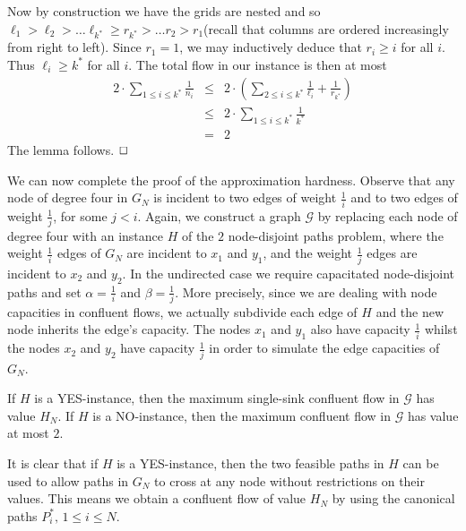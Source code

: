 \documentclass[12pt]{article}
\newcommand{\qed}{$\hfill{\Box}$}
\begin{document}
Now by construction we have the grids are nested and so
$\ell_1 > \ell_2 > \ldots \ell_{k^*} \geq r_{k^*} > \ldots r_2 > r_1$(recall that columns are ordered increasingly from
right to left). Since $r_1=1$, we may inductively deduce that
$r_{i} \geq i$ for all $i$. Thus $\ell_i \ge k^*$ for all $i$.
The total flow in our instance is then at most
\begin{eqnarray*}
2\cdot \sum_{1 \leq i \leq k^*}  \frac{1}{n_i} &\leq& 2\cdot (\sum_{2 \leq i \leq k^*} \frac{1}{\ell_i} + \frac{1}{r_{k^*}}) \\
&\le& 2\cdot \sum_{1 \leq i \leq k^*} \frac{1}{k^*} \\
&=& 2
\end{eqnarray*}
The lemma follows.
\qed








We can now complete the proof of the approximation hardness. Observe that any
node of degree four in $G_N$ is incident to two edges of weight
$\frac{1}{i}$ and to two edges of weight $\frac{1}{j}$, for some $j < i$. Again, we
construct a graph $\mathcal{G}$ by replacing each node of degree four with
an instance $H$ of the $2$ node-disjoint paths problem,
where the weight $\frac{1}{i}$
edges of $G_N$ are incident to $x_1$ and $y_1$, and the weight $\frac{1}{j}$
edges are incident to $x_2$ and $y_2$.
In the undirected case we require capacitated node-disjoint paths
and set $\alpha=\frac{1}{i}$ and $\beta=\frac{1}{j}$.
More precisely, since we are dealing with node capacities in confluent flows,
we actually subdivide each edge of $H$ and the new node
inherits the edge's capacity.
The nodes $x_1$ and $y_1$ also have capacity $\frac{1}{i}$ whilst the nodes
$x_2$ and $y_2$ have capacity $\frac{1}{j}$ in order to simulate the edge capacities of $G_N$.




\begin{lemma}\label{lem:yes2}
If $H$ is a YES-instance, then the maximum single-sink confluent flow in
$\mathcal{G}$ has value $H_N$.  If $H$ is a NO-instance, then the maximum
confluent flow in $\mathcal{G}$ has value at most $2$.
\end{lemma}
  It is clear that if $H$ is a YES-instance, then the two feasible paths
in $H$ can be used to allow paths in $G_N$ to cross at any node
without restrictions on their values. This means we obtain a confluent flow of value
$H_N$ by using the canonical paths $P^*_i, \, 1 \le i \le N$.
\end{document}
